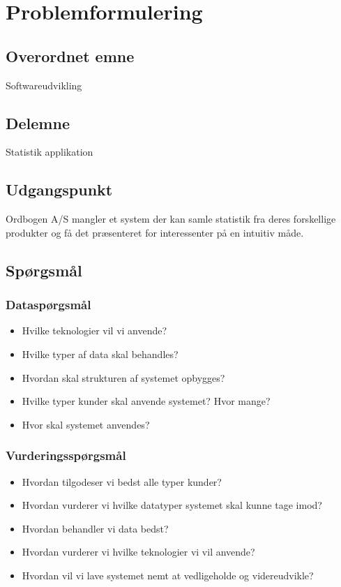 \section{Problemformulering}
\subsection{Overordnet emne}
Softwareudvikling
\subsection{Delemne}
Statistik applikation
\subsection{Udgangspunkt}
Ordbogen A/S mangler et system der kan samle statistik fra deres forskellige produkter og få det præsenteret for interessenter på en intuitiv måde.
\subsection{Spørgsmål}
\subsubsection{Dataspørgsmål}
\begin{itemize}
    \item{Hvilke teknologier vil vi anvende?}
    \item{Hvilke typer af data skal behandles?}
    \item{Hvordan skal strukturen af systemet opbygges?}
    \item{Hvilke typer kunder skal anvende systemet? Hvor mange?}
    \item{Hvor skal systemet anvendes?}
\end{itemize}
\subsubsection{Vurderingsspørgsmål}
\begin{itemize}
    \item{Hvordan tilgodeser vi bedst alle typer kunder?}
    \item{Hvordan vurderer vi hvilke datatyper systemet skal kunne tage imod?}
    \item{Hvordan behandler vi data bedst?}
    \item{Hvordan vurderer vi hvilke teknologier vi vil anvende?}
    \item{Hvordan vil vi lave systemet nemt at vedligeholde og videreudvikle?}
\end{itemize}
